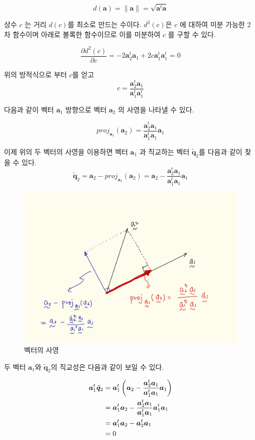 \documentclass[
]{book}
\newcommand{\pardiff}[2]{\frac{\partial #1}{\partial #2 }}
\newcommand{\norm}[1]{\left\lVert#1\right\rVert}
\theoremstyle{definition}
\theoremstyle{definition}
\theoremstyle{definition}
\theoremstyle{remark}
\begin{document}
\[ d(\bm a) = \norm{\bm a} = \sqrt{\bm a^t \bm a} \]

상수 \(c\) 는 거리 \(d(c)\)를 최소로 만드는 수이다. \(d^2(c)\)은 \(c\) 에 대하여 미분 가능한 2차 함수이며 아래로 볼록한 함수이므로 이를 미분하여 \(c\) 를 구할 수 있다.

\[ \pardiff{d^2(c)}{c} = - 2\bm a_2^t \bm a_1 + 2c \bm a^t_1 \bm a^t_1 =0 \]

위의 방적식으로 부터 \(c\)를 얻고
\[ c= \frac{\bm a_2^t \bm a_1  }{\bm a^t_1 \bm a^t_1} \]

다음과 같이 벡터 \(\bm a_1\) 방향으로 벡터 \(\bm a_2\) 의 사영을 나타낼 수 있다.

\begin{equation} 
proj_{\bm a_1} (\bm a_2) = \frac{ \bm a_2^t \bm a_1} {\bm a_1^t \bm a_1} \bm a_1
\label{eq:proj1}
\end{equation}

이제 위의 두 벡터의 사영을 이용하면 벡터 \(\bm a_1\) 과 직교하는 벡터 \(\tilde {\bm q}_2\)를 다음과 같이 찾을 수 있다.
\[ \tilde {\bm q}_2 = \bm a_2 - proj_{\bm a_1} (\bm a_2) = \bm a_2 -  \frac{\bm a_2^t \bm a_1} {\bm a_1^t \bm a_1} \bm a_1 \]

\begin{figure}
\centering
\includegraphics{proj1.png}
\caption{벡터의 사영}
\end{figure}

두 벡터 \(\bm a_1\)와 \(\tilde {\bm q}_2\)의 직교성은 다음과 같이 보일 수 있다.

\begin{align}
\bm a_1^t  \tilde {\bm q}_2 & =
 \bm a_1^t  \left ( \bm a_2 -  \frac{ \bm a_2^t \bm a_1} {\bm a_1^t \bm a_1} \bm a_1 \right ) \notag \\
 & = \bm a_1^t \bm a_2 - \frac{ \bm a_2^t \bm a_1} {\bm a_1^t \bm a_1}  \bm a_1^t \bm a_1 \notag \\
 & = \bm a_1^t \bm a_2 - \bm a_2^t \bm a_1 \notag \\
 & = 0 
 \label{eq:proofortho}
\end{align}
\end{document}
